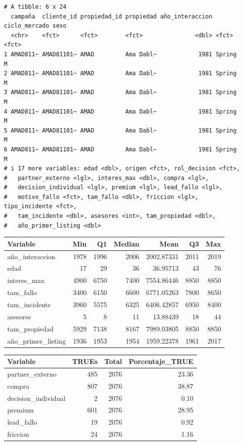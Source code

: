 \documentclass[
  letterpaper,
  DIV=11,
  numbers=noendperiod]{scrartcl}
\begin{document}
\begin{verbatim}
# A tibble: 6 x 24
  campaña  cliente_id propiedad_id propiedad año_interaccion ciclo_mercado sexo 
  <chr>    <fct>      <fct>        <fct>               <dbl> <fct>         <fct>
1 AMAD811~ AMAD81101~ AMAD         Ama Dabl~            1981 Spring        M    
2 AMAD811~ AMAD81101~ AMAD         Ama Dabl~            1981 Spring        M    
3 AMAD811~ AMAD81101~ AMAD         Ama Dabl~            1981 Spring        M    
4 AMAD811~ AMAD81101~ AMAD         Ama Dabl~            1981 Spring        M    
5 AMAD811~ AMAD81101~ AMAD         Ama Dabl~            1981 Spring        M    
6 AMAD811~ AMAD81101~ AMAD         Ama Dabl~            1981 Spring        M    
# i 17 more variables: edad <dbl>, origen <fct>, rol_decision <fct>,
#   partner_externo <lgl>, interes_max <dbl>, compra <lgl>,
#   decision_individual <lgl>, premium <lgl>, lead_fallo <lgl>,
#   motivo_fallo <fct>, tam_fallo <dbl>, friccion <lgl>, tipo_incidente <fct>,
#   tam_incidente <dbl>, asesores <int>, tam_propiedad <dbl>,
#   año_primer_listing <dbl>
\end{verbatim}

\begingroup\fontsize{12}{14}\selectfont

\begin{longtable*}[t]{lrrrrrr}
\toprule
Variable & Min & Q1 & Median & Mean & Q3 & Max\\
\midrule
año\_interaccion & 1978 & 1996 & 2006 & 2002.87331 & 2011 & 2019\\
edad & 17 & 29 & 36 & 36.95713 & 43 & 76\\
interes\_max & 4900 & 6750 & 7400 & 7554.86446 & 8850 & 8850\\
tam\_fallo & 3400 & 6150 & 6600 & 6771.05263 & 7800 & 8650\\
tam\_incidente & 3960 & 5575 & 6325 & 6406.42857 & 6950 & 8400\\
\addlinespace
asesores & 5 & 8 & 11 & 13.88439 & 18 & 44\\
tam\_propiedad & 5929 & 7138 & 8167 & 7989.03805 & 8850 & 8850\\
año\_primer\_listing & 1936 & 1953 & 1954 & 1959.22378 & 1961 & 2017\\
\bottomrule
\end{longtable*}
\endgroup{}

\begingroup\fontsize{12}{14}\selectfont

\begin{longtable*}[t]{lrrr}
\toprule
Variable & TRUEs & Total & Porcentaje\_TRUE\\
\midrule
partner\_externo & 485 & 2076 & 23.36\\
compra & 807 & 2076 & 38.87\\
decision\_individual & 2 & 2076 & 0.10\\
premium & 601 & 2076 & 28.95\\
lead\_fallo & 19 & 2076 & 0.92\\
\addlinespace
friccion & 24 & 2076 & 1.16\\
\bottomrule
\end{longtable*}
\endgroup{}
\end{document}
